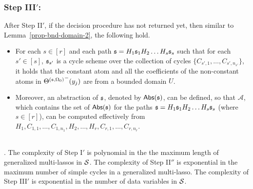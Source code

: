 \subsubsection{Step III$'$:}
After Step II$'$, if the decision procedure has not returned yet, then similar to Lemma~\ref{prop-bnd-domain-2}, the following hold.
\begin{itemize}
\item For each $s \in [r]$ and each path ${\mathfrak{s} }=H_1 {\mathfrak{s} }_1 H_2 \dots H_s {\mathfrak{s} }_s$ such that for each $s'\in [s]$, ${\mathfrak{s} }_{s'}$ is a cycle scheme over the collection of cycles $\{C_{s',1},\dots,C_{s',n_{s'}}\}$, it holds that the constant atom and all the coefficients of the non-constant atoms in ${\Theta^{({\mathfrak{s} },\Omega_0)}}^-(y_j)$ are from a bounded domain $U$.
%
\item Moreover,  an abstraction of ${\mathfrak{s} }$, denoted by $\mathsf{Abs}({\mathfrak{s} })$, can be defined, so that $\mathscr{A}$, which contains the set of $\mathsf{Abs}({\mathfrak{s} })$ for the paths ${\mathfrak{s} }=H_1 {\mathfrak{s} }_1 H_2 \dots H_s {\mathfrak{s} }_s$ (where $s \in [r]$), can be computed effectively from 
$H_1, C_{1,1}, \dots, C_{1,n_1},H_2,\dots, H_r,C_{r,1},\dots, C_{r,n_r}$.
\end{itemize}
\smallskip
{}\medskip\\

. The complexity of Step I$'$ is polynomial in the the maximum length of generalized multi-lassos in ${\mathcal{S} }$. The complexity of Step II$''$ is exponential in the maximum number of simple cycles in a generalized multi-lasso. The complexity of Step III$'$ is exponential in the number of data variables in ${\mathcal{S} }$.

